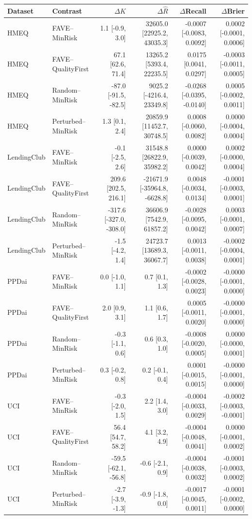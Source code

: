 \begin{tabular}{llrrrr}
\toprule
Dataset & Contrast & $\Delta K$ & $\Delta\widehat R$ & $\Delta$Recall & $\Delta$Brier \\
\midrule
HMEQ & FAVE--MinRisk & 1.1 [-0.9, 3.0] & 32605.0 [22925.2, 43035.3] & -0.0007 [-0.0083, 0.0092] & 0.0002 [-0.0001, 0.0006] \\
HMEQ & FAVE--QualityFirst & 67.1 [62.6, 71.4] & 13265.2 [5393.4, 22235.5] & 0.0175 [0.0041, 0.0297] & -0.0003 [-0.0011, 0.0005] \\
HMEQ & Random--MinRisk & -87.0 [-91.5, -82.5] & 9025.2 [-4216.4, 23349.8] & -0.0268 [-0.0395, -0.0140] & 0.0005 [-0.0002, 0.0011] \\
HMEQ & Perturbed--MinRisk & 1.3 [0.1, 2.4] & 20859.9 [11452.7, 30748.5] & 0.0008 [-0.0060, 0.0082] & 0.0000 [-0.0004, 0.0004] \\
LendingClub & FAVE--MinRisk & -0.1 [-2.5, 2.6] & 31548.8 [26822.9, 35982.2] & 0.0000 [-0.0039, 0.0042] & 0.0002 [-0.0000, 0.0004] \\
LendingClub & FAVE--QualityFirst & 209.6 [202.5, 216.1] & -21671.9 [-35964.8, -6628.8] & 0.0048 [-0.0034, 0.0134] & -0.0001 [-0.0003, 0.0001] \\
LendingClub & Random--MinRisk & -317.6 [-327.0, -308.0] & 36606.9 [7542.9, 61857.2] & -0.0028 [-0.0095, 0.0042] & 0.0003 [-0.0001, 0.0007] \\
LendingClub & Perturbed--MinRisk & -1.5 [-4.2, 1.4] & 24723.7 [13689.3, 36067.7] & 0.0013 [-0.0011, 0.0038] & -0.0002 [-0.0004, 0.0001] \\
PPDai & FAVE--MinRisk & 0.0 [-1.0, 1.1] & 0.7 [0.1, 1.3] & -0.0002 [-0.0028, 0.0023] & -0.0000 [-0.0001, 0.0000] \\
PPDai & FAVE--QualityFirst & 2.0 [0.9, 3.1] & 1.1 [0.6, 1.7] & 0.0005 [-0.0011, 0.0020] & -0.0000 [-0.0001, 0.0000] \\
PPDai & Random--MinRisk & -0.3 [-1.1, 0.6] & 0.6 [0.3, 1.0] & -0.0008 [-0.0020, 0.0005] & 0.0000 [-0.0000, 0.0001] \\
PPDai & Perturbed--MinRisk & 0.3 [-0.2, 0.8] & 0.2 [-0.1, 0.4] & 0.0001 [-0.0015, 0.0015] & -0.0000 [-0.0001, 0.0000] \\
UCI & FAVE--MinRisk & -0.3 [-2.0, 1.5] & 2.2 [1.4, 3.0] & -0.0004 [-0.0033, 0.0029] & -0.0002 [-0.0003, -0.0001] \\
UCI & FAVE--QualityFirst & 56.4 [54.7, 58.2] & 4.1 [3.2, 4.9] & -0.0004 [-0.0048, 0.0041] & 0.0000 [-0.0001, 0.0002] \\
UCI & Random--MinRisk & -59.5 [-62.1, -56.8] & -0.6 [-2.1, 0.9] & -0.0004 [-0.0038, 0.0032] & -0.0001 [-0.0003, 0.0002] \\
UCI & Perturbed--MinRisk & -2.7 [-3.9, -1.3] & -0.9 [-1.8, 0.0] & -0.0017 [-0.0045, 0.0011] & -0.0001 [-0.0002, 0.0000] \\
\bottomrule
\end{tabular}
